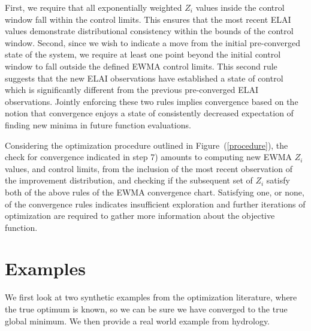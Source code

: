 \documentclass[12pt]{article}
\begin{document}
First, we require that all exponentially weighted $Z_i$ values inside the control window fall within the control limits.
%
This ensures that the most recent ELAI values demonstrate distributional consistency within the bounds of the control window.
%
Second, since we wish to indicate a move from the initial pre-converged state of the system, we require at least one point beyond the initial control window to fall outside the defined EWMA control limits.
This second rule suggests that the new ELAI observations have established a state of control which is significantly different from the previous pre-converged ELAI observations.
%
Jointly enforcing these two rules implies convergence based on the notion that convergence enjoys a state of consistently decreased expectation of finding new minima in future function evaluations.

%
%

%
Considering the optimization procedure outlined in Figure~(\ref{procedure}), the check for convergence indicated in step 7) amounts to computing new EWMA $Z_i$ values, and control limits, from the inclusion of the most recent observation of the improvement distribution, and checking if the subsequent set of $Z_i$ satisfy both of the above rules of the EWMA convergence chart.
%
Satisfying one, or none, of the convergence rules indicates insufficient exploration and further iterations of optimization are required to gather more information about the objective function.    


%
%
%
\section{Examples}
\label{sec:examples}
%
We first look at two synthetic examples from the optimization literature, where the true optimum is known, so we can be sure we have converged to the true global minimum.  
%
We then provide a real world example from hydrology.
\end{document}
